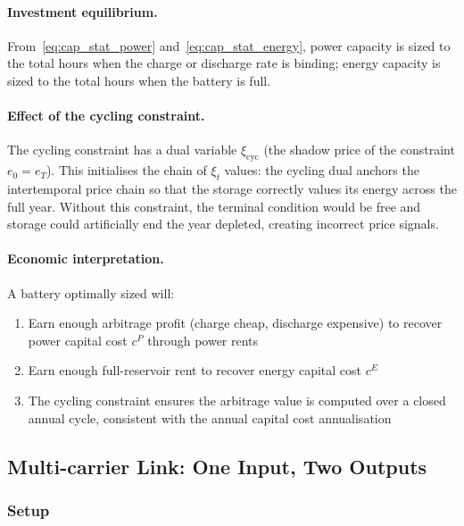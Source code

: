 \documentclass{article}
\begin{document}
\paragraph{Investment equilibrium.}
From~\eqref{eq:cap_stat_power} and~\eqref{eq:cap_stat_energy}, power capacity is
sized to the total hours when the charge or discharge rate is binding; energy
capacity is sized to the total hours when the battery is full.

\paragraph{Effect of the cycling constraint.}
The cycling constraint has a dual variable $\xi_{\text{cyc}}$ (the shadow price
of the constraint $e_0 = e_T$). This initialises the chain of
$\xi_t$ values: the cycling dual anchors the intertemporal price chain so that
the storage correctly values its energy across the full year. Without this
constraint, the terminal condition would be free and storage could artificially
end the year depleted, creating incorrect price signals.

\paragraph{Economic interpretation.}
A battery optimally sized will:
\begin{enumerate}
    \item Earn enough arbitrage profit (charge cheap, discharge expensive) to
          recover power capital cost $c^P$ through power rents
    \item Earn enough full-reservoir rent to recover energy capital cost $c^E$
    \item The cycling constraint ensures the arbitrage value is computed over
          a closed annual cycle, consistent with the annual capital cost annualisation
\end{enumerate}

\subsection{Multi-carrier Link: One Input, Two Outputs}
\label{sec:multilink}

\subsubsection{Setup}
\end{document}
